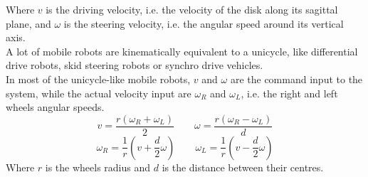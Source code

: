 Where $v$ is the driving velocity, i.e. the velocity of the disk along its sagittal plane, and $\omega$ is the steering velocity, i.e. the angular speed around its vertical axis.\\
A lot of mobile robots are kinematically equivalent to a unicycle, like differential drive robots, skid steering robots or synchro drive vehicles.\\
In most of the unicycle-like mobile robots, $v$ and $\omega$ are the command input to the system, while the actual velocity input are $\omega_R$ and $\omega_L$, i.e. the right and left wheels angular speeds. 
\begin{equation}
v=\frac{r\left(\omega_R + \omega_L\right)}{2} \qquad \omega=\frac{r\left(\omega_R - \omega_L\right)}{d}
\end{equation}
\begin{equation}
\omega_R =\frac{1}{r}\left(v+\frac{d}{2}\omega\right) \qquad \omega_L=\frac{1}{r}\left(v-\frac{d}{2}\omega\right)
\end{equation}
Where $r$ is the wheels radius and $d$ is the distance between their centres.


